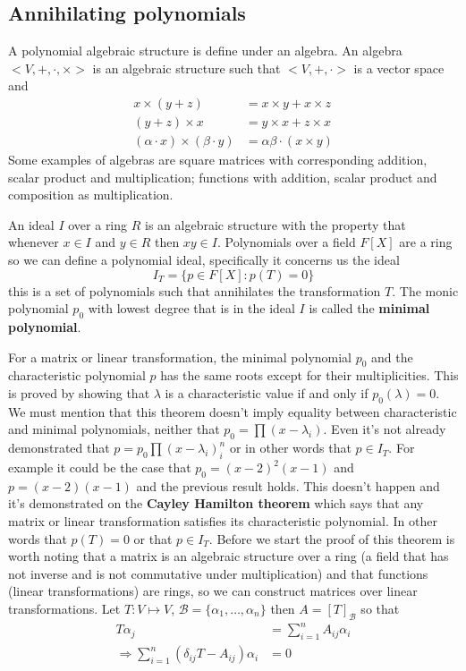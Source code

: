 \documentclass[../../../main.tex]{subfiles}
\begin{document}
\subsection{Annihilating polynomials}
A polynomial algebraic structure is define under an algebra. An algebra $<V,+,\cdot,\times>$ is an algebraic structure such that $<V,+,\cdot>$ is a vector space and 
\begin{align*}
    x\times(y+z)&=x\times y + x\times z\\
    (y+z)\times x &= y\times x + z\times x\\
    (\alpha\cdot x)\times(\beta\cdot y) &=\alpha\beta\cdot(x\times y)
\end{align*}
Some examples of algebras are square matrices with corresponding addition, scalar product and multiplication; functions with addition, scalar product and composition as multiplication.

An ideal $I$ over a ring $R$ is an algebraic structure with the property that whenever $x\in I$ and $y\in R$ then $xy\in I$. Polynomials over a field $F[X]$ are a ring so we can define a polynomial ideal, specifically it concerns us the ideal 
\begin{equation*}
    I_T = \{p\in F[X]: p(T)=0\}
\end{equation*}
this is a set of polynomials such that annihilates the transformation $T$. The monic polynomial $p_0$ with lowest degree that is in the ideal $I$ is called the \textbf{minimal polynomial}.

For a matrix or linear transformation, the minimal polynomial $p_0$ and the characteristic polynomial $p$ has the same roots except for their multiplicities. This is proved by showing that $\lambda$ is a characteristic value if and only if $p_0(\lambda)=0$. We must mention that this theorem doesn't imply equality between characteristic and minimal polynomials, neither that $p_0=\prod (x-\lambda_i)$. Even it's not already demonstrated that $p = p_0\prod (x-\lambda_i)^n_i$ or in other words that $p\in I_T$. For example it could be the case that $p_0 = (x-2)^2 (x-1)$ and $p = (x-2)(x-1)$ and the previous result holds. This doesn't happen and it's demonstrated on the \textbf{Cayley Hamilton theorem} which says that any matrix or linear transformation satisfies its characteristic polynomial. In other words that $p(T)=0$ or that $p\in I_T$.
Before we start the proof of this theorem is worth noting that a matrix is an algebraic structure over a ring (a field that has not inverse and is not commutative under multiplication) and that functions (linear transformations) are rings, so we can construct matrices over linear transformations.
Let $T:V\mapsto V$, $\mathcal{B}=\{\alpha_1,\dots,\alpha_n\}$ then $A = [T]_{\mathcal{B}}$ so that
\begin{align*}
    T\alpha_j 
    &= \sum_{i=1}^n A_{ij}\alpha_i\\
    \Longrightarrow \sum_{i=1}^n (\delta_{ij}T - A_{ij})\alpha_i &= 0\\
\end{align*}
\end{document}
